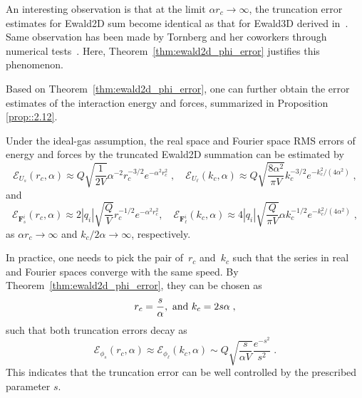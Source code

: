An interesting observation is that at the limit $\alpha r_c\rightarrow \infty$, the truncation error estimates for Ewald2D sum become identical as that for Ewald3D derived in~\cite{kolafa1992cutoff}.
Same observation has been made by Tornberg and her coworkers through numerical tests~\cite{lindbo2012fast,shamshirgar2021fast}. 
Here, Theorem~\ref{thm:ewald2d_phi_error} justifies this phenomenon.

Based on Theorem~\ref{thm:ewald2d_phi_error}, one can further obtain the error estimates of the interaction energy and forces, summarized in Proposition \ref{prop::2.12}.

\begin{prop}\label{prop::2.12}
	Under the ideal-gas assumption, the real space and Fourier space RMS errors of energy and forces by the truncated Ewald2D summation can be estimated by
	\begin{equation}\label{thm:ewald2d_error}
		\mathscr{E}_{U_s} (r_c, \alpha) \approx Q \sqrt{\frac{1}{2 V}} \alpha^{-2} r_c^{-3/2} e^{-\alpha^2r_c^2}\;,\quad
		\mathscr{E}_{U_{\ell}} (k_c, \alpha) \approx Q \sqrt{\frac{8 \alpha^2}{\pi V}} k_c^{-3/2} e^{- k_c^2/(4 \alpha^2)}\;,
	\end{equation}
	and
	\begin{equation}
		\mathscr{E}_{\bm{F}_{s}^i} (r_c, \alpha)\approx 2|q_{i}|\sqrt{\frac{Q}{V}}r_c^{-1/2}e^{-\alpha^2 r_c^2},\quad \mathscr{E}_{\bm{F}_{\ell}^i} (k_c, \alpha)\approx 4|q_{i}|\sqrt{\frac{Q}{\pi V}}\alpha k_c^{-1/2}e^{-k_c^2/(4\alpha^2)}\;,
	\end{equation}
	as $\alpha r_c\rightarrow\infty$ and $k_c/2\alpha\rightarrow\infty$, respectively.
\end{prop}

\begin{rmk}
	In practice, one needs to pick the pair of~$r_c$ and~$k_c$
	such that the series in real and Fourier spaces converge with the same speed.
	By Theorem~\ref{thm:ewald2d_phi_error}, they can be chosen as
	\begin{equation}\label{eq::rckc}
		r_c = \frac{s}{\alpha},~\hbox{and}~k_c = 2 s \alpha\;,
	\end{equation}
	such that both truncation errors decay as 
	\begin{equation}\label{eq:trunction_error}
		\mathscr{E}_{\phi_s}(r_c, \alpha)\approx \mathscr{E}_{\phi_\ell}(k_c, \alpha) \sim Q 
		\sqrt{\frac{s}{\alpha V}} \frac{e^{-s^2}}{s^2}\;.
	\end{equation}
	This indicates that the truncation error can be well controlled by the prescribed parameter $s$. 
\end{rmk}

